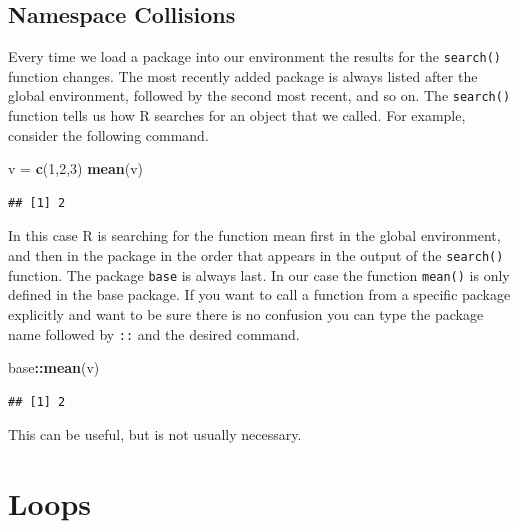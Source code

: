\documentclass[
]{book}
\newenvironment{Shaded}{\begin{snugshade}}{\end{snugshade}}
\newcommand{\DecValTok}[1]{\textcolor[rgb]{0.00,0.00,0.81}{#1}}
\newcommand{\KeywordTok}[1]{\textcolor[rgb]{0.13,0.29,0.53}{\textbf{#1}}}
\newcommand{\NormalTok}[1]{#1}
\newcommand{\OperatorTok}[1]{\textcolor[rgb]{0.81,0.36,0.00}{\textbf{#1}}}
\newcommand{\StringTok}[1]{\textcolor[rgb]{0.31,0.60,0.02}{#1}}
\begin{document}
\hypertarget{namespace-collisions}{%
\section{Namespace Collisions}\label{namespace-collisions}}

Every time we load a package into our environment the results for the \texttt{search()} function changes. The most recently added package is always listed after the global environment, followed by the second most recent, and so on.
The \texttt{search()} function tells us how R searches for an object that we called. For example, consider the following command.

\begin{Shaded}
\begin{Highlighting}[]
\NormalTok{v =}\StringTok{ }\KeywordTok{c}\NormalTok{(}\DecValTok{1}\NormalTok{,}\DecValTok{2}\NormalTok{,}\DecValTok{3}\NormalTok{)}
\KeywordTok{mean}\NormalTok{(v)}
\end{Highlighting}
\end{Shaded}

\begin{verbatim}
## [1] 2
\end{verbatim}

In this case R is searching for the function mean first in the global environment, and then in the package in the order that appears in the output of the \texttt{search()} function. The package \texttt{base} is always last. In our case the function \texttt{mean()} is only defined in the base package. If you want to call a function from a specific package explicitly and want to be sure there is no confusion you can type the package name followed by \texttt{::} and the desired command.

\begin{Shaded}
\begin{Highlighting}[]
\NormalTok{base}\OperatorTok{::}\KeywordTok{mean}\NormalTok{(v)}
\end{Highlighting}
\end{Shaded}

\begin{verbatim}
## [1] 2
\end{verbatim}

This can be useful, but is not usually necessary.

\hypertarget{loops}{%
\chapter{Loops}\label{loops}}
\end{document}
